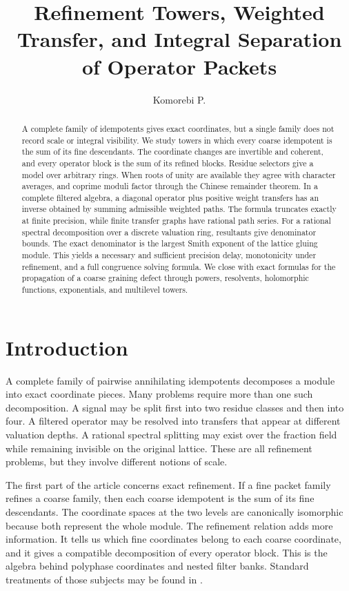 \documentclass{aomart}
\title[Refinement towers and integral separation]{Refinement Towers, Weighted Transfer, and Integral Separation of Operator Packets}
\author[Komorebi P.]{Komorebi P.}
\theoremstyle{definition}
\theoremstyle{remark}
\begin{document}
\begin{abstract}
A complete family of idempotents gives exact coordinates, but a single family does not record scale or integral visibility.  We study towers in which every coarse idempotent is the sum of its fine descendants.  The coordinate changes are invertible and coherent, and every operator block is the sum of its refined blocks.  Residue selectors give a model over arbitrary rings.  When roots of unity are available they agree with character averages, and coprime moduli factor through the Chinese remainder theorem.  In a complete filtered algebra, a diagonal operator plus positive weight transfers has an inverse obtained by summing admissible weighted paths.  The formula truncates exactly at finite precision, while finite transfer graphs have rational path series.  For a rational spectral decomposition over a discrete valuation ring, resultants give denominator bounds.  The exact denominator is the largest Smith exponent of the lattice gluing module.  This yields a necessary and sufficient precision delay, monotonicity under refinement, and a full congruence solving formula.  We close with exact formulas for the propagation of a coarse graining defect through powers, resolvents, holomorphic functions, exponentials, and multilevel towers.
\end{abstract}
\maketitle
\thispagestyle{plain}

\section{Introduction}

A complete family of pairwise annihilating idempotents decomposes a module into exact coordinate pieces.  Many problems require more than one such decomposition.  A signal may be split first into two residue classes and then into four.  A filtered operator may be resolved into transfers that appear at different valuation depths.  A rational spectral splitting may exist over the fraction field while remaining invisible on the original lattice.  These are all refinement problems, but they involve different notions of scale.

The first part of the article concerns exact refinement.  If a fine packet family refines a coarse family, then each coarse idempotent is the sum of its fine descendants.  The coordinate spaces at the two levels are canonically isomorphic because both represent the whole module.  The refinement relation adds more information.  It tells us which fine coordinates belong to each coarse coordinate, and it gives a compatible decomposition of every operator block.  This is the algebra behind polyphase coordinates and nested filter banks.  Standard treatments of those subjects may be found in \cite{Vaidyanathan1993,Daubechies1992}.
\end{document}
